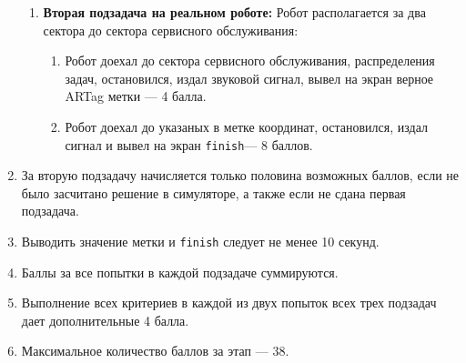 \begin{enumerate}
\begin{enumerate}
        \item \textbf{Вторая подзадача на реальном роботе:} Робот располагается за два сектора до сектора сервисного обслуживания:
            \begin{enumerate}
                \item Робот доехал до сектора сервисного обслуживания, распределения задач, остановился, издал звуковой сигнал,
                    вывел на экран верное ARTag метки --- 4 балла.
                \item Робот доехал до указаных в метке координат, остановился, издал сигнал и вывел на экран
                    \texttt{finish}--- 8 баллов.
            \end{enumerate}

    \end{enumerate}
    \item За вторую подзадачу начисляется только половина возможных баллов, если не было засчитано решение в симуляторе, а также если не сдана
        первая подзадача.
    \item Выводить значение метки и \texttt{finish} следует не менее 10 секунд.
    \item Баллы за все попытки в каждой подзадаче суммируются.
    \item Выполнение всех критериев в каждой из двух попыток всех трех подзадач дает дополнительные 4 балла.
    \item Максимальное количество баллов за этап --- 38.
\end{enumerate}